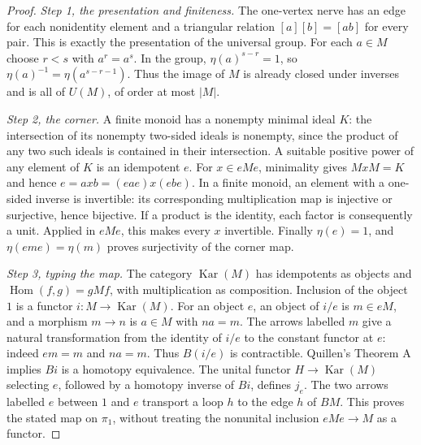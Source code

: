 \begin{proof}
\emph{Step 1, the presentation and finiteness.}
The one-vertex nerve has an edge for each nonidentity element and a triangular
relation $[a][b]=[ab]$ for every pair. This is exactly the presentation of the
universal group. For each $a\in M$ choose $r<s$ with $a^r=a^s$. In the group,
$\eta(a)^{s-r}=1$, so $\eta(a)^{-1}=\eta(a^{s-r-1})$. Thus the image of $M$ is
already closed under inverses and is all of $U(M)$, of order at most $|M|$.

\emph{Step 2, the corner.}
A finite monoid has a nonempty minimal ideal $K$: the intersection of its
nonempty two-sided ideals is nonempty, since the product of any two such ideals
is contained in their intersection. A suitable positive power of any element
of $K$ is an idempotent $e$. For $x\in eMe$, minimality gives $MxM=K$ and hence
$e=axb=(eae)x(ebe)$. In a finite monoid, an element with a one-sided inverse is
invertible: its corresponding multiplication map is injective or surjective,
hence bijective. If a product is the identity, each factor is consequently a
unit. Applied in $eMe$, this makes every $x$ invertible. Finally $\eta(e)=1$,
and $\eta(eme)=\eta(m)$ proves surjectivity of the corner map.

\emph{Step 3, typing the map.}
The category $\operatorname{Kar}(M)$ has idempotents as objects and
$\operatorname{Hom}(f,g)=gMf$, with multiplication as composition. Inclusion of
the object $1$ is a functor $i:M\to\operatorname{Kar}(M)$. For an object $e$,
an object of $i/e$ is $m\in eM$, and a morphism $m\to n$ is $a\in M$ with
$na=m$. The arrows labelled $m$ give a natural transformation from the identity
of $i/e$ to the constant functor at $e$: indeed $em=m$ and $na=m$. Thus $B(i/e)$
is contractible. Quillen's Theorem A \cite[Section~1]{quillen1973} implies
$Bi$ is a homotopy equivalence.
The unital functor $H\to\operatorname{Kar}(M)$ selecting $e$, followed by a
homotopy inverse of $Bi$, defines $j_e$. The two arrows labelled $e$ between
$1$ and $e$ transport a loop $h$ to the edge $h$ of $BM$. This proves the stated
map on $\pi_1$, without treating the nonunital inclusion $eMe\to M$ as a functor.
\end{proof}

